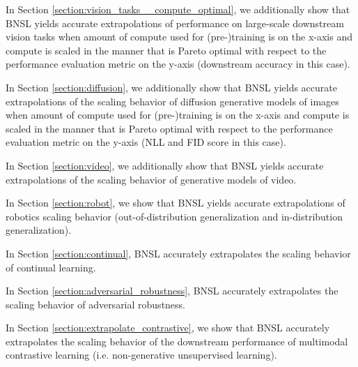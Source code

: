 \documentclass{article} %
\begin{document}
\vspace{-0.6mm}

In Section \ref{section:vision_tasks__compute_optimal}, we additionally show that BNSL yields accurate extrapolations of performance on large-scale downstream vision tasks when amount of compute used for (pre-)training is on the x-axis and compute is scaled in the manner that is Pareto optimal with respect to the performance evaluation metric on the y-axis (downstream accuracy in this case).

\vspace{-2.1mm}

In Section \ref{section:diffusion}, we additionally show that BNSL yields accurate extrapolations of the scaling behavior of diffusion generative models of images when amount of compute used for (pre-)training is on the x-axis and compute is scaled in the manner that is Pareto optimal with respect to the performance evaluation metric on the y-axis (NLL and FID score in this case).

\vspace{-2.1mm}

In Section \ref{section:video}, we additionally show that BNSL yields accurate extrapolations of the scaling behavior of generative models of video.

\vspace{-2.1mm}

In Section \ref{section:robot}, we show that BNSL yields accurate extrapolations of robotics scaling behavior (out-of-distribution generalization and in-distribution generalization).

\vspace{-2.1mm}


In Section \ref{section:continual}, BNSL accurately extrapolates the scaling behavior of continual learning.

\vspace{-2.1mm}

In Section \ref{section:adversarial_robustness}, BNSL accurately extrapolates the scaling behavior of adversarial robustness.

\vspace{-2.1mm}

In Section \ref{section:extrapolate_contrastive}, we show that BNSL accurately extrapolates the scaling behavior of the downstream performance of multimodal contrastive learning (i.e. non-generative unsupervised learning).
\end{document}
